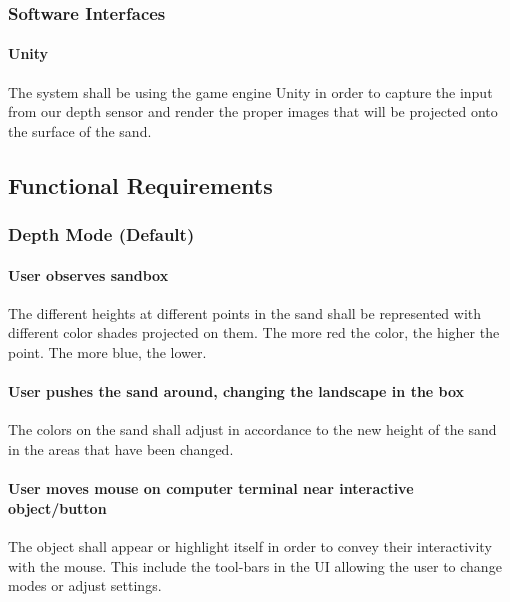 \documentclass[onecolumn, draftclsnofoot,10pt, compsoc]{IEEEtran}
\begin{document}
\subsubsection{Software Interfaces}
\paragraph{Unity}
The system shall be using the game engine Unity in order to capture the input from our depth sensor and render the proper images that will be projected onto the surface of the sand.  

\subsection{Functional Requirements}
\subsubsection{Depth Mode (Default)}

\paragraph{User observes sandbox}
The different heights at different points in the sand shall be represented with different color shades projected on them.  The more red the color, the higher the point.  The more blue, the lower.

\paragraph{User pushes the sand around, changing the landscape in the box}
The colors on the sand shall adjust in accordance to the new height of the sand in the areas that have been changed. 


\paragraph{User moves mouse on computer terminal near interactive object/button}
The object shall appear or highlight itself in order to convey their interactivity with the mouse.  This include the tool-bars in the UI allowing the user to change modes or adjust settings.
\end{document}
